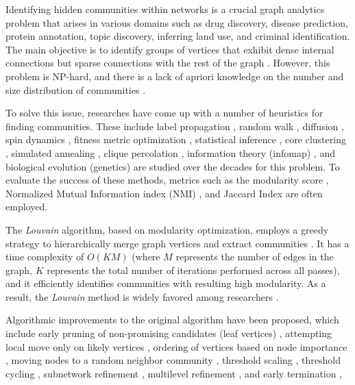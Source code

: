 Identifying hidden communities within networks is a crucial graph analytics problem that arises in various domains such as drug discovery, disease prediction, protein annotation, topic discovery, inferring land use, and criminal identification. The main objective is to identify groups of vertices that exhibit dense internal connections but sparse connections with the rest of the graph \cite{com-gregory10}. However, this problem is NP-hard, and there is a lack of apriori knowledge on the number and size distribution of communities \cite{com-blondel08}.

To solve this issue, researches have come up with a number of heuristics for finding communities. These include label propagation \cite{com-raghavan07, com-gregory10}, random walk \cite{com-rosvall08}, diffusion \cite{com-kloster14}, spin dynamics \cite{com-reichardt06}, fitness metric optimization \cite{com-newman06, com-fortunato10}, statistical inference \cite{com-come15, com-newman16}, core clustering \cite{com-ruan15}, simulated annealing \cite{com-guimera05, com-reichardt06}, clique percolation \cite{com-derenyi05, com-gupta22}, information theory (infomap) \cite{infomap-rosvall09, com-rita20}, and  biological evolution (genetics) \cite{com-ghoshal19, com-lu20} are studied over the decades for this problem. To evaluate the success of these methods, metrics such as the modularity score \cite{com-newman06, com-blondel08}, Normalized Mutual Information index (NMI) \cite{com-jain17, com-chopade17}, and Jaccard Index \cite{com-jain17} are often employed.

The \textit{Louvain} algorithm, based on modularity optimization, employs a greedy strategy to hierarchically merge graph vertices and extract communities \cite{com-blondel08}. It has a time complexity of $O(KM)$ (where $M$ represents the number of edges in the graph, $K$ represents the total number of iterations performed across all passes), and it efficiently identifies communities with resulting high modularity. As a result, the \textit{Louvain} method is widely favored among researchers \cite{com-lancichinetti09}.

Algorithmic improvements to the original algorithm have been proposed, which include early pruning of non-promising candidates (leaf vertices) \cite{com-ryu16, com-halappanavar17, com-zhang21, com-you22}, attempting local move only on likely vertices \cite{com-ryu16, com-ozaki16, com-zhang21, com-shi21}, ordering of vertices based on node importance \cite{com-aldabobi22}, moving nodes to a random neighbor community \cite{com-traag15}, threshold scaling \cite{com-lu15, com-naim17, com-halappanavar17}, threshold cycling \cite{com-ghosh18}, subnetwork refinement \cite{com-waltman13, com-traag19}, multilevel refinement \cite{com-rotta11, com-gach14, com-shi21}, and early termination \cite{com-ghosh18},

